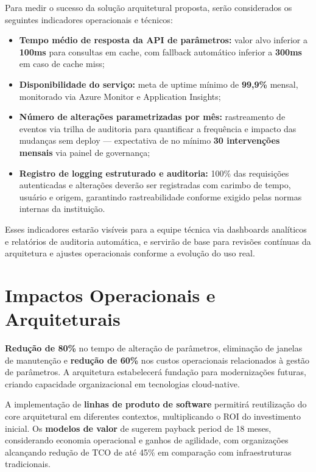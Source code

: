 Para medir o sucesso da solução arquitetural proposta, serão considerados os seguintes indicadores operacionais e técnicos:

\begin{itemize}
	\item \textbf{Tempo médio de resposta da API de parâmetros:} valor alvo inferior a \textbf{100ms} para consultas em cache, com fallback automático inferior a \textbf{300ms} em caso de cache miss;
	
	\item \textbf{Disponibilidade do serviço:} meta de uptime mínimo de \textbf{99,9\%} mensal, monitorado via Azure Monitor e Application Insights;
	
	\item \textbf{Número de alterações parametrizadas por mês:} rastreamento de eventos via trilha de auditoria para quantificar a frequência e impacto das mudanças sem deploy — expectativa de no mínimo \textbf{30 intervenções mensais} via painel de governança;
	
	\item \textbf{Registro de logging estruturado e auditoria:} 100\% das requisições autenticadas e alterações deverão ser registradas com carimbo de tempo, usuário e origem, garantindo rastreabilidade conforme exigido pelas normas internas da instituição.
\end{itemize}

Esses indicadores estarão visíveis para a equipe técnica via dashboards analíticos e relatórios de auditoria automática, e servirão de base para revisões contínuas da arquitetura e ajustes operacionais conforme a evolução do uso real.

\section{Impactos Operacionais e Arquiteturais}

\textbf{Redução de 80\%} no tempo de alteração de parâmetros, eliminação de janelas de manutenção e \textbf{redução de 60\%} nos custos operacionais relacionados à gestão de parâmetros. A arquitetura estabelecerá fundação para modernizações futuras, criando capacidade organizacional em tecnologias cloud-native.

A implementação de \textbf{linhas de produto de software}  permitirá reutilização do core arquitetural em diferentes contextos, multiplicando o ROI do investimento inicial. Os \textbf{modelos de valor} de  sugerem payback period de 18 meses, considerando economia operacional e ganhos de agilidade, com organizações alcançando redução de TCO de até 45\% em comparação com infraestruturas tradicionais.

